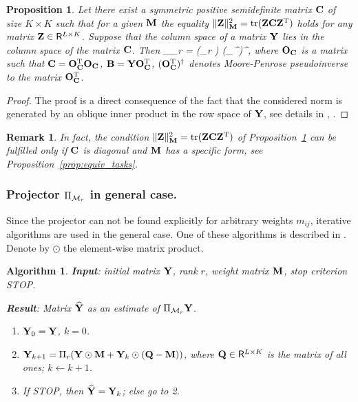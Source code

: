 \documentclass[sii]{ipart}
\DeclareMathOperator{\tr}{tr}
\newtheorem{proposition}{Proposition}
\newtheorem{algorithm}{Algorithm}
\newtheorem{remark}{Remark}
\begin{document}
\begin{proposition}
	\label{prop:projS}
	Let there exist a symmetric positive semidefinite matrix $\mathbf{C}$ of size $K \times K$ such that for a given $\mathbf{M}$ the  equality $\|\bfZ\|_\bfM^2 = \tr(\bfZ \bfC \bfZ^\rmT)$ holds for any matrix $\mathbf{Z}\in \mathsf{R}^{L\times K}$.
	Suppose that the column space of a matrix $\mathbf{Y}$ lies in the column space of the matrix $\mathbf{C}$.
	Then
	\be
	\label{eq:PiMr}
	\Pi_{\calM_r} \bfY = (\Pi_r \bfB) (\bfO_\bfC^{\rmT})^\dagger,
	\ee
	where $\mathbf{O}_{\mathbf{C}}$ is a matrix such that $\mathbf{C} = \mathbf{O}_{\mathbf{C}}^{\mathrm{T}}\mathbf{O}_{\mathbf{C}}$,
	$\mathbf{B} = \mathbf{Y} \mathbf{O}_{\mathbf{C}}^{\mathrm{T}}$, $(\mathbf{O}_{\mathbf{C}}^{\mathrm{T}})^\dagger$ denotes  Moore-Penrose pseudoinverse to the matrix $\mathbf{O}_{\mathbf{C}}^{\mathrm{T}}$.
\end{proposition}
\begin{proof}
	The proof is a direct consequence of the fact that the considered norm is generated by an oblique inner product in the row space of $\mathbf{Y}$, see details in \cite{Golyandina2013}, \cite{Allen2014}.
\end{proof}

\begin{remark}
\label{rem:diagC}
	In fact, the condition $\|\bfZ\|_\bfM^2 = \tr(\bfZ \bfC \bfZ^\rmT)$ of Proposition~\ref{prop:projS} can be fulfilled only if $\mathbf{C}$ is diagonal and $\mathbf{M}$ has a specific form, see Proposition~\ref{prop:equiv_tasks}.
\end{remark}

\subsubsection{Projector $\Pi_{\mathcal{M}_r}$ in general case.}
Since the projector can not be found explicitly for arbitrary weights $m_{ij}$, iterative algorithms are used in the general case.
One of these algorithms is described in \cite{Srebro2003}. Denote by $\odot$ the element-wise matrix product.

\begin{algorithm}
	\label{alg:weightedSVD}
	\textbf{Input}: initial matrix $\mathbf{Y}$, rank $r$, weight matrix $\mathbf{M}$,
	stop criterion STOP.
	
	\textbf{Result}:
	Matrix $\widehat{\mathbf{Y}}$ as an estimate of $\Pi_{\mathcal{M}_r} \mathbf{Y}$.
	
	\begin{enumerate}
		\item
		$\mathbf{Y}_0 = \mathbf{Y}$, $k=0$.
		\item
		$\mathbf{Y}_{k+1} = \Pi_r(\mathbf{Y} \odot \mathbf{M} + \mathbf{Y}_{k} \odot (\mathbf{Q} -  \mathbf{M}))$, where
		$\mathbf{Q} \in \mathsf{R}^{L \times K}$ is the matrix of all ones;
        \quad $k\leftarrow k+1$.
		\item
		If STOP, then $\widehat{\mathbf{Y}} = \mathbf{Y}_k$; else go to 2.
	\end{enumerate}
\end{algorithm}
\end{document}
